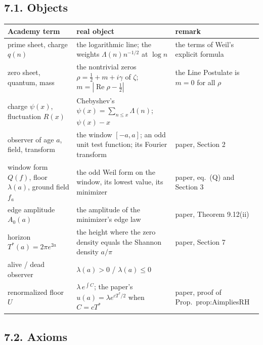 \documentclass[11pt]{article}
\theoremstyle{definition}
\theoremstyle{remark}
\newcommand{\Tst}{T^{*}}
\newcommand{\Ree}{\operatorname{Re}}
\newcommand{\ps}{\psi}
\begin{document}
\subsection*{7.1. Objects}

\begin{center}\small
\begin{tabular}{@{}p{3.6cm}p{6.2cm}p{5.4cm}@{}}
\toprule
Academy term & real object & remark\\
\midrule
prime sheet, charge $q(n)$ & the logarithmic line; the weights $\Lambda(n)n^{-1/2}$ at $\log n$ & the terms of Weil's explicit formula\\
zero sheet, quantum, mass & the nontrivial zeros $\rho=\tfrac12+m+i\gamma$ of $\zeta$; $m=|\Ree\rho-\tfrac12|$ & the Line Postulate is $m=0$ for all $\rho$\\
charge $\ps(x)$, fluctuation $R(x)$ & Chebyshev's $\ps(x)=\sum_{n\le x}\Lambda(n)$; $\ps(x)-x$ & \\
observer of age $a$, field, transform & the window $[-a,a]$; an odd unit test function; its Fourier transform & paper, Section 2\\
window form $Q(f)$, floor $\lambda(a)$, ground field $f_a$ & the odd Weil form on the window, its lowest value, its minimizer & paper, eq.\ (Q) and Section 3\\
edge amplitude $A_0(a)$ & the amplitude of the minimizer's edge law & paper, Theorem 9.12(ii)\\
horizon $\Tst(a)=2\pi e^{2a}$ & the height where the zero density equals the Shannon density $a/\pi$ & paper, Section 7\\
alive / dead observer & $\lambda(a)>0$ / $\lambda(a)\le0$ & \\
renormalized floor $U$ & $\lambda\,e^{\int C}$; the paper's $u(a)=\lambda e^{c\Tst/2}$ when $C=c\Tst$ & paper, proof of Prop.\ prop:AimpliesRH\\
\bottomrule
\end{tabular}
\end{center}

\subsection*{7.2. Axioms}
\end{document}
